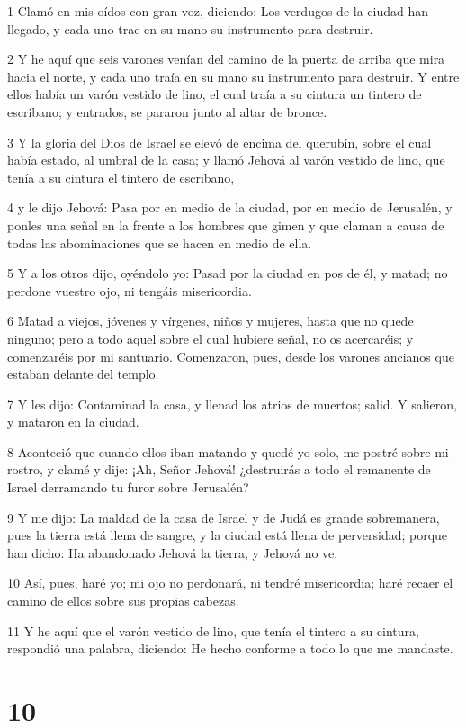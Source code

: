 \par 1 Clamó en mis oídos con gran voz, diciendo: Los verdugos de la ciudad han llegado, y cada uno trae en su mano su instrumento para destruir.
\par 2 Y he aquí que seis varones venían del camino de la puerta de arriba que mira hacia el norte, y cada uno traía en su mano su instrumento para destruir. Y entre ellos había un varón vestido de lino, el cual traía a su cintura un tintero de escribano; y entrados, se pararon junto al altar de bronce.
\par 3 Y la gloria del Dios de Israel se elevó de encima del querubín, sobre el cual había estado, al umbral de la casa; y llamó Jehová al varón vestido de lino, que tenía a su cintura el tintero de escribano,
\par 4 y le dijo Jehová: Pasa por en medio de la ciudad, por en medio de Jerusalén, y ponles una señal en la frente a los hombres que gimen y que claman a causa de todas las abominaciones que se hacen en medio de ella.
\par 5 Y a los otros dijo, oyéndolo yo: Pasad por la ciudad en pos de él, y matad; no perdone vuestro ojo, ni tengáis misericordia.
\par 6 Matad a viejos, jóvenes y vírgenes, niños y mujeres, hasta que no quede ninguno; pero a todo aquel sobre el cual hubiere señal, no os acercaréis; y comenzaréis por mi santuario. Comenzaron, pues, desde los varones ancianos que estaban delante del templo.
\par 7 Y les dijo: Contaminad la casa, y llenad los atrios de muertos; salid. Y salieron, y mataron en la ciudad.
\par 8 Aconteció que cuando ellos iban matando y quedé yo solo, me postré sobre mi rostro, y clamé y dije: ¡Ah, Señor Jehová! ¿destruirás a todo el remanente de Israel derramando tu furor sobre Jerusalén?
\par 9 Y me dijo: La maldad de la casa de Israel y de Judá es grande sobremanera, pues la tierra está llena de sangre, y la ciudad está llena de perversidad; porque han dicho: Ha abandonado Jehová la tierra, y Jehová no ve.
\par 10 Así, pues, haré yo; mi ojo no perdonará, ni tendré misericordia; haré recaer el camino de ellos sobre sus propias cabezas.
\par 11 Y he aquí que el varón vestido de lino, que tenía el tintero a su cintura, respondió una palabra, diciendo: He hecho conforme a todo lo que me mandaste.

\chapter{10}

